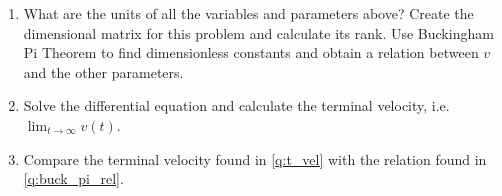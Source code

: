 \documentclass[letter]{article}
\begin{document}
\begin{enumerate}[resume,label=\textbf{\arabic*.}]

\item What are the units of all the variables and parameters above? Create the dimensional matrix for this problem and calculate its rank.
	\label{q:buck_pi_rel}Use Buckingham Pi Theorem to find dimensionless constants and obtain a relation between $v$ and the other parameters.

\item \label{q:t_vel} Solve the differential equation and calculate the terminal velocity, i.e. $\displaystyle \lim_{t \to \infty} v(t)$. 

\item Compare the terminal velocity found in \ref{q:t_vel} with the relation found in \ref{q:buck_pi_rel}.

\end{enumerate}

	
\end{document}

